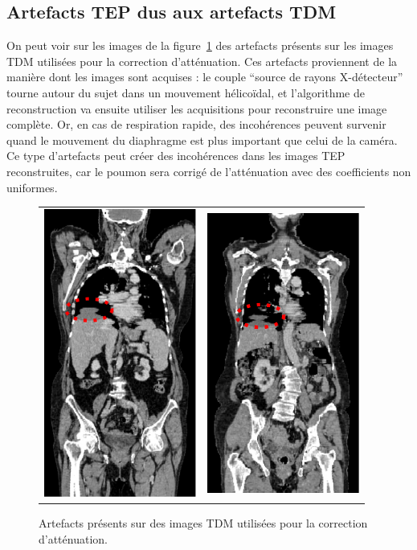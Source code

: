 \subsection{Artefacts TEP dus aux artefacts TDM}

On peut voir sur les images de la figure~\ref{fig:artefactsCT} des artefacts présents sur les images TDM utilisées pour la correction d'atténuation. Ces artefacts proviennent de la manière dont les images sont acquises : le couple ``source de rayons X-détecteur'' tourne autour du sujet dans un mouvement hélicoïdal, et l'algorithme de reconstruction va ensuite utiliser les acquisitions pour reconstruire une image complète. Or, en cas de respiration rapide, des incohérences peuvent survenir quand le mouvement du diaphragme est plus important que celui de la caméra. Ce type d'artefacts peut créer des incohérences dans les images TEP reconstruites, car le poumon sera corrigé de l'atténuation avec des coefficients non uniformes.

\begin{figure}[h!]
	\begin{center}
		\begin{tabular}{c c}
			\includegraphics[width=5cm]{images/artefactCT1} & \includegraphics[width=5cm]{images/artefactCT2}
		\end{tabular}
	\end{center}
	\caption{Artefacts présents sur des images TDM utilisées pour la correction d'atténuation.} 
	\label{fig:artefactsCT}
\end{figure}


